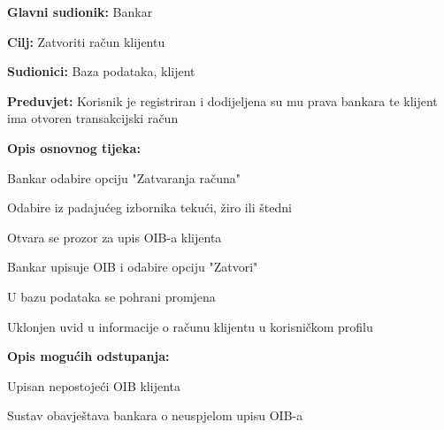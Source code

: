                 
                \noindent {}
                \begin{packed_item}
                
                  \item \textbf{Glavni sudionik: }Bankar
                  \item  \textbf{Cilj:} Zatvoriti račun klijentu
                  \item  \textbf{Sudionici:} Baza podataka, klijent
                  \item  \textbf{Preduvjet:} Korisnik je registriran i dodijeljena su mu prava bankara te klijent ima otvoren transakcijski račun
                  \item  \textbf{Opis osnovnog tijeka:}
                  
                  \item[] \begin{packed_enum}
                
                    \item Bankar odabire opciju "Zatvaranja računa"
                    \item Odabire iz padajućeg izbornika tekući, žiro ili štedni
                    \item Otvara se prozor za upis OIB-a klijenta 
                    \item Bankar upisuje OIB i odabire opciju "Zatvori"                    
                    \item U bazu podataka se pohrani promjena
                    \item Uklonjen uvid u informacije o računu klijentu u korisničkom profilu
                  \end{packed_enum}
                  
                  \item  \textbf{Opis mogućih odstupanja:}
                  
                  \item[] \begin{packed_item}
                
                    \item[3.a] Upisan nepostojeći OIB klijenta
                    \item[] \begin{packed_enum}
                      
                      \item Sustav obavještava bankara o neuspjelom upisu OIB-a 
                      
                    \end{packed_enum}
                    
                  \end{packed_item}
                \end{packed_item}             
                            
